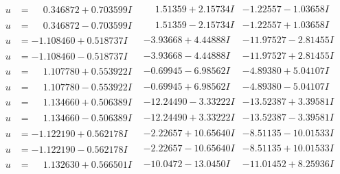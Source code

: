 \documentclass[1p]{elsarticle_modified}
\theoremstyle{definition}
\begin{document}
$$\begin{array}{c|c|c}
\begin{aligned}
u &= \phantom{-}0.346872 + 0.703599 I\end{aligned}
 & \phantom{-}1.51359 + 2.15734 I & -1.22557 - 1.03658 I \\ \hline\begin{aligned}
u &= \phantom{-}0.346872 - 0.703599 I\end{aligned}
 & \phantom{-}1.51359 - 2.15734 I & -1.22557 + 1.03658 I \\ \hline\begin{aligned}
u &= -1.108460 + 0.518737 I\end{aligned}
 & -3.93668 + 4.44888 I & -11.97527 - 2.81455 I \\ \hline\begin{aligned}
u &= -1.108460 - 0.518737 I\end{aligned}
 & -3.93668 - 4.44888 I & -11.97527 + 2.81455 I \\ \hline\begin{aligned}
u &= \phantom{-}1.107780 + 0.553922 I\end{aligned}
 & -0.69945 - 6.98562 I & -4.89380 + 5.04107 I \\ \hline\begin{aligned}
u &= \phantom{-}1.107780 - 0.553922 I\end{aligned}
 & -0.69945 + 6.98562 I & -4.89380 - 5.04107 I \\ \hline\begin{aligned}
u &= \phantom{-}1.134660 + 0.506389 I\end{aligned}
 & -12.24490 - 3.33222 I & -13.52387 + 3.39581 I \\ \hline\begin{aligned}
u &= \phantom{-}1.134660 - 0.506389 I\end{aligned}
 & -12.24490 + 3.33222 I & -13.52387 - 3.39581 I \\ \hline\begin{aligned}
u &= -1.122190 + 0.562178 I\end{aligned}
 & -2.22657 + 10.65640 I & -8.51135 - 10.01533 I \\ \hline\begin{aligned}
u &= -1.122190 - 0.562178 I\end{aligned}
 & -2.22657 - 10.65640 I & -8.51135 + 10.01533 I \\ \hline\begin{aligned}
u &= \phantom{-}1.132630 + 0.566501 I\end{aligned}
 & -10.0472 - 13.0450 I & -11.01452 + 8.25936 I \\ \hline\begin{aligned}

\end{aligned}
\end{array}$$
\end{document}
